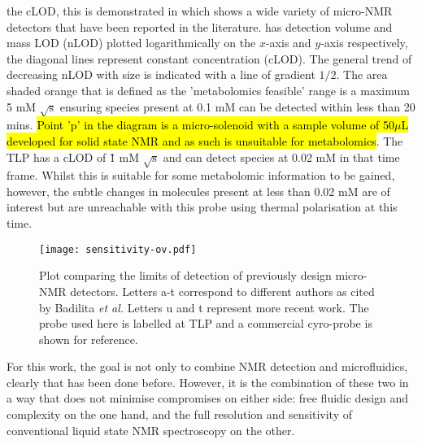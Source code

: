the cLOD, this is demonstrated in  which shows a wide variety of micro-NMR detectors that have been reported in the literature.
 has detection volume and mass LOD (nLOD) plotted logarithmically
on the $x$-axis and $y$-axis respectively, the diagonal lines represent constant concentration (cLOD).
The general trend of decreasing nLOD with size is indicated with a line of gradient $1/2$. The area shaded orange that
is defined as the 'metabolomics feasible' range is a maximum 5 mM $\sqrt{\text{s}}$
ensuring species present at 0.1 mM can be detected within less than 20 mins. \hl{Point 'p' in the diagram is a micro-solenoid with a sample volume of 50$\mu$L developed for solid state NMR \citep{yamauchi2004implementing} and as such is unsuitable for metabolomics}. The TLP has a cLOD of \~1 mM $\sqrt{\text{s}}$ and can detect
species at 0.02 mM in that time frame. Whilst this is suitable for some metabolomic information to be
gained, however, the subtle changes in molecules present at less than 0.02 mM are of interest but
are unreachable with this probe using thermal polarisation at this time.
\begin{figure}
  \texttt{[image: sensitivity-ov.pdf]}
  \caption{Plot comparing the limits of detection of previously design micro-NMR detectors. Letters
  a-t correspond to different authors as cited by Badilita \textit{et al.} \citep{Badilita:2011td} Letters u \citep{Meier:2014ds}
  and t \citep{RN165} represent more recent work. The probe used here is labelled at TLP and a commercial cyro-probe is shown for reference.}
  \label{fig:cLOD}
\end{figure}

For this work, the goal is not only to combine NMR detection and microfluidics, clearly that has been done before. However,
it is the combination of these two in a way that does not minimise compromises on either side: free fluidic design and complexity
on the one hand, and the full resolution and sensitivity of conventional liquid state NMR spectroscopy on the other.
